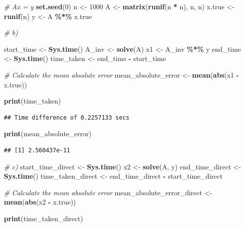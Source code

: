 \documentclass[
]{article}
\newenvironment{Shaded}{\begin{snugshade}}{\end{snugshade}}
\newcommand{\CommentTok}[1]{\textcolor[rgb]{0.56,0.35,0.01}{\textit{#1}}}
\newcommand{\DecValTok}[1]{\textcolor[rgb]{0.00,0.00,0.81}{#1}}
\newcommand{\FunctionTok}[1]{\textcolor[rgb]{0.13,0.29,0.53}{\textbf{#1}}}
\newcommand{\NormalTok}[1]{#1}
\newcommand{\OtherTok}[1]{\textcolor[rgb]{0.56,0.35,0.01}{#1}}
\newcommand{\SpecialCharTok}[1]{\textcolor[rgb]{0.81,0.36,0.00}{\textbf{#1}}}
\begin{document}
\begin{Shaded}
\begin{Highlighting}[]
\CommentTok{\# Ax = y}
\FunctionTok{set.seed}\NormalTok{(}\DecValTok{0}\NormalTok{)}
\NormalTok{n }\OtherTok{\textless{}{-}} \DecValTok{1000}
\NormalTok{A }\OtherTok{\textless{}{-}} \FunctionTok{matrix}\NormalTok{(}\FunctionTok{runif}\NormalTok{(n }\SpecialCharTok{*}\NormalTok{ n), n, n)}
\NormalTok{x.true }\OtherTok{\textless{}{-}} \FunctionTok{runif}\NormalTok{(n)}
\NormalTok{y }\OtherTok{\textless{}{-}}\NormalTok{ A }\SpecialCharTok{\%*\%}\NormalTok{ x.true}

\CommentTok{\# b)}

\NormalTok{start\_time }\OtherTok{\textless{}{-}} \FunctionTok{Sys.time}\NormalTok{()}
\NormalTok{A\_inv }\OtherTok{\textless{}{-}} \FunctionTok{solve}\NormalTok{(A)}
\NormalTok{x1 }\OtherTok{\textless{}{-}}\NormalTok{ A\_inv }\SpecialCharTok{\%*\%}\NormalTok{ y}
\NormalTok{end\_time }\OtherTok{\textless{}{-}} \FunctionTok{Sys.time}\NormalTok{()}
\NormalTok{time\_taken }\OtherTok{\textless{}{-}}\NormalTok{ end\_time }\SpecialCharTok{{-}}\NormalTok{ start\_time}

\CommentTok{\# Calculate the mean absolute error}
\NormalTok{mean\_absolute\_error }\OtherTok{\textless{}{-}} \FunctionTok{mean}\NormalTok{(}\FunctionTok{abs}\NormalTok{(x1 }\SpecialCharTok{{-}}\NormalTok{ x.true))}

\FunctionTok{print}\NormalTok{(time\_taken)}
\end{Highlighting}
\end{Shaded}

\begin{verbatim}
## Time difference of 0.2257133 secs
\end{verbatim}

\begin{Shaded}
\begin{Highlighting}[]
\FunctionTok{print}\NormalTok{(mean\_absolute\_error)}
\end{Highlighting}
\end{Shaded}

\begin{verbatim}
## [1] 2.560437e-11
\end{verbatim}

\begin{Shaded}
\begin{Highlighting}[]
\CommentTok{\# c)}
\NormalTok{start\_time\_direct }\OtherTok{\textless{}{-}} \FunctionTok{Sys.time}\NormalTok{()}
\NormalTok{x2 }\OtherTok{\textless{}{-}} \FunctionTok{solve}\NormalTok{(A, y)}
\NormalTok{end\_time\_direct }\OtherTok{\textless{}{-}} \FunctionTok{Sys.time}\NormalTok{()}
\NormalTok{time\_taken\_direct }\OtherTok{\textless{}{-}}\NormalTok{ end\_time\_direct }\SpecialCharTok{{-}}\NormalTok{ start\_time\_direct}

\CommentTok{\# Calculate the mean absolute error}
\NormalTok{mean\_absolute\_error\_direct }\OtherTok{\textless{}{-}} \FunctionTok{mean}\NormalTok{(}\FunctionTok{abs}\NormalTok{(x2 }\SpecialCharTok{{-}}\NormalTok{ x.true))}

\FunctionTok{print}\NormalTok{(time\_taken\_direct)}
\end{Highlighting}
\end{Shaded}
\end{document}
